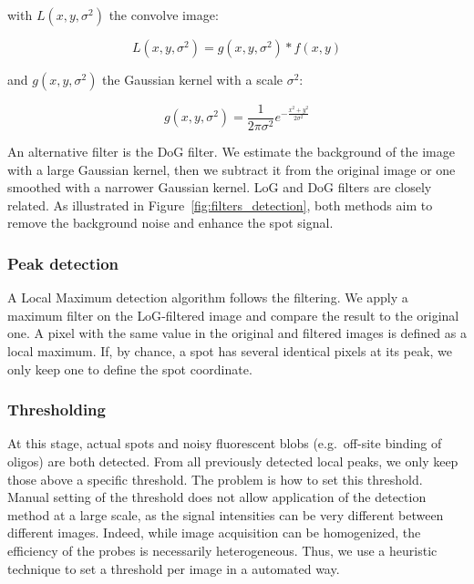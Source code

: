 \noindent
with $L(x, y, \sigma^2)$ the convolve image:

\begin{equation}
	{\displaystyle L(x, y, \sigma^2) = g(x, y, \sigma^2) * f(x, y)}
\end{equation}

\noindent
and $g(x, y, \sigma^2)$ the Gaussian kernel with a scale $\sigma^2$:

\begin{equation}
	{\displaystyle g(x, y, \sigma^2) = \frac{1}{2\pi \sigma^2} e^{-{\frac{x^{2} + y^{2}}{2\sigma^2}}}}
\end{equation}

An alternative filter is the \ac{DoG} filter.
We estimate the background of the image with a large Gaussian kernel, then we subtract it from the original image or one smoothed with a narrower Gaussian kernel.
\ac{LoG} and \ac{DoG} filters are closely related.
As illustrated in Figure~\ref{fig:filters_detection}, both methods aim to remove the background noise and enhance the spot signal.

\subsubsection{Peak detection}

A Local Maximum detection algorithm follows the filtering.
We apply a maximum filter on the \ac{LoG}-filtered image and compare the result to the original one.
A pixel with the same value in the original and filtered images is defined as a local maximum.
If, by chance, a spot has several identical pixels at its peak, we only keep one to define the spot coordinate.

\subsubsection{Thresholding}

At this stage, actual spots and noisy fluorescent blobs (e.g.~off-site binding of oligos) are both detected.
From all previously detected local peaks, we only keep those above a specific threshold.
The problem is how to set this threshold.
Manual setting of the threshold does not allow application of the detection method at a large scale, as the signal intensities can be very different between different images.
Indeed, while image acquisition can be homogenized, the efficiency of the probes is necessarily heterogeneous.
Thus, we use a heuristic technique to set a threshold per image in a automated way.

